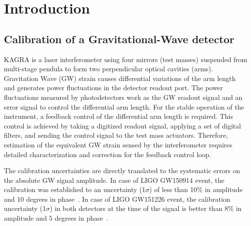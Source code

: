 
\chapter{Introduction} %

\label{Chapter1} %


\newcommand{\keyword}[1]{\textbf{#1}}
\newcommand{\tabhead}[1]{\textbf{#1}}
\newcommand{\code}[1]{\texttt{#1}}
\newcommand{\file}[1]{\texttt{\bfseries#1}}
\newcommand{\option}[1]{\texttt{\itshape#1}}


\section{Calibration of a Gravitational-Wave detector}

KAGRA is a laser interferometer using four mirrors (test masses) suspended 
from multi-stage pendula to form two perpendicular optical cavities (arms).
Gravitation Wave (GW) strain causes differential variations of the arm length
and generates power fluctuations in the detector readout port. 
The power fluctuations measured by photodetectors work as the GW readout 
signal and an error signal to control the differential arm length. 
For the stable operation of the instrument, a feedback control of the 
differential arm length is required. This control is achieved by taking 
a digitized readout signal, applying a set of digital filters, and sending 
the control signal to the test mass actuators. Therefore, estimation 
of the equivalent GW strain sensed by the interferometer requires 
detailed characterization and correction for the feedback control loop.

The calibration uncertainties are directly translated to the systematic 
errors on the absolute GW signal amplitude. In case of LIGO GW150914 event, 
the calibration was established to an uncertainty (1$\sigma$) of less than 
10\% in amplitude and 10 degrees in phase~\cite{GW150914}.
In case of LIGO GW151226 event, the calibration uncertainty (1$\sigma$) 
in both detectors at the time of the signal is better than 8\% 
in amplitude and 5 degrees in phase~\cite{GW151226}.

